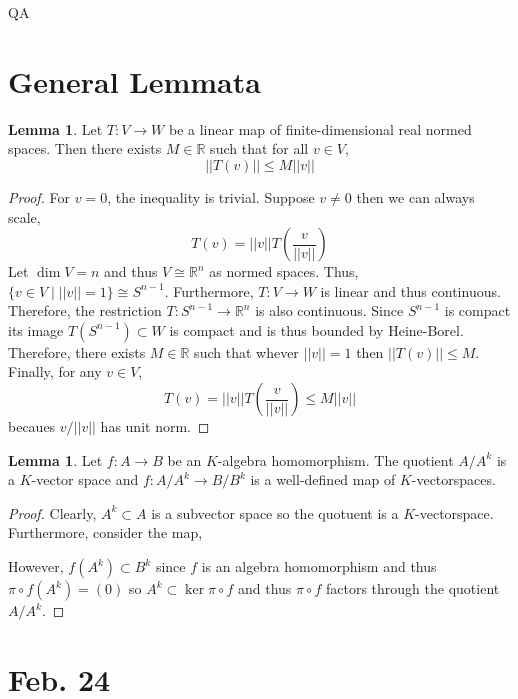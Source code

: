 QA	 \documentclass[12pt]{extarticle}
\newcommand{\R}{\mathbb{R}}
\theoremstyle{definition}
\newtheorem{lemma}[theorem]{Lemma}
\begin{document}
\section{General Lemmata}

\begin{lemma} \label{bounded_lin_op}
Let $T : V \to W$ be a linear map of finite-dimensional real normed spaces. Then there exists $M \in \R$ such that for all $v \in V$,
\[ ||T(v)|| \le M ||v|| \]
\end{lemma}

\begin{proof}
For $v = 0$, the inequality is trivial. Suppose $v \neq 0$ then we can always scale,
\[ T(v) = ||v|| T \left( \frac{v}{||v||} \right) \]
Let $\dim{V} = n$ and thus $V \cong \R^n$ as normed spaces. Thus, $\{ v \in V \mid ||v|| = 1\} \cong S^{n-1}$. Furthermore, $T : V \to W$ is linear and thus continuous. Therefore, the restriction $T : S^{n-1} \to \R^n$ is also continuous. Since $S^{n-1}$ is compact its image $T(S^{n-1}) \subset W$ is compact and is thus bounded by Heine-Borel. Therefore, there exists $M \in \R$ such that whever $||v|| = 1$ then $||T(v)|| \le M$. Finally, for any $v \in V$,
\[ T(v) = ||v|| T \left( \frac{v}{||v||} \right) \le M ||v|| \]
becaues $v / ||v||$ has unit norm. 
\end{proof}

\begin{lemma} \label{ring_map_quotient}
Let $f : A \to B$ be an $K$-algebra homomorphism. The quotient $A / A^k$ is a $K$-vector space and $f : A / A^k \to B / B^k$ is a well-defined map of $K$-vectorspaces. 
\end{lemma}

\begin{proof}
Clearly, $A^k \subset A$ is a subvector space so the quotuent is a $K$-vectorspace. Furthermore, consider the map,
\begin{center}
\end{center}
However, $f(A^k) \subset B^k$ since $f$ is an algebra homomorphism and thus $\pi \circ f(A^k) = (0)$ so $A^k \subset \ker{\pi \circ f}$ and thus $\pi \circ f$ factors through the quotient $A / A^k$.  
\end{proof}


\section{Feb. 24}
\end{document}
